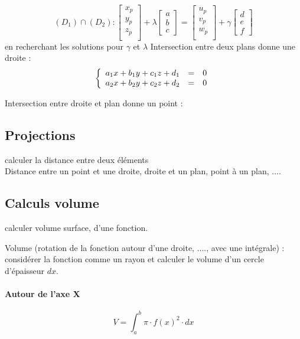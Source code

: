\documentclass[12pt,a4paper,twoside]{article}
\numberwithin{equation}{subsection}
\begin{document}
\begin{equation}
(D_1)\cap(D_2):
\begin{bmatrix}
x_p\\
y_p\\
z_p\\
\end{bmatrix}
+
\lambda
\begin{bmatrix}
a\\
b \\
c
\end{bmatrix}
=
\begin{bmatrix}
u_p\\
v_p\\
w_p\\
\end{bmatrix}
+
\gamma
\begin{bmatrix}
d\\
e \\
f
\end{bmatrix}
\end{equation}
en recherchant les solutions pour $\gamma$ et $\lambda$
\medbreak
Intersection entre deux plans donne une droite : 
\begin{eqnarray}
\left\{
\begin{array}{l c r}
	a_1x+b_1 y+c_1 z+d_1 &=&0\\
	a_2 x+ b_2 y + c_2 z + d_2 &=&0
\end{array}
\right.
\end{eqnarray}

Intersection entre droite et plan donne un point :


\subsection{Projections}
calculer la distance entre deux éléments\\
Distance entre un point et une droite, droite et un plan, point à un plan, ....
\subsection{Calculs volume}

calculer volume surface, d'une fonction.

Volume (rotation de la fonction autour d'une droite, ...., avec une intégrale) : considérer la fonction comme un rayon et calculer le volume d'un cercle d'épaisseur $dx$.\\
\paragraph{Autour de l'axe X}
\begin{equation}
V=\int_{a}^{b}\pi \cdot f(x)^2 \cdot dx
\end{equation}
\end{document}
